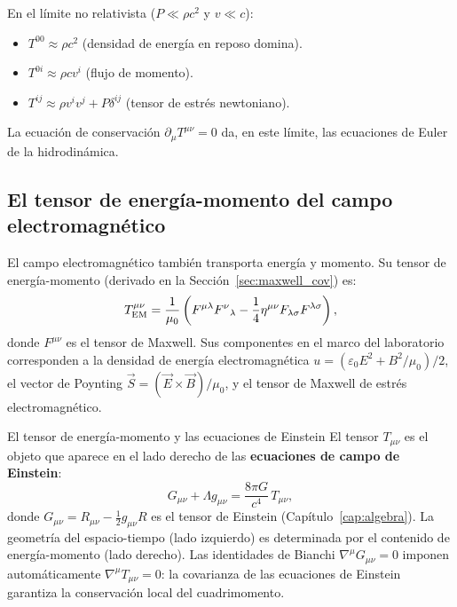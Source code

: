 \begin{importante}
En el límite no relativista ($P \ll \rho c^2$ y $v \ll c$):
\begin{itemize}[leftmargin=2em]
  \item $T^{00} \approx \rho c^2$ (densidad de energía en reposo domina).
  \item $T^{0i} \approx \rho c v^i$ (flujo de momento).
  \item $T^{ij} \approx \rho v^i v^j + P\delta^{ij}$ (tensor de estrés newtoniano).
\end{itemize}
La ecuación de conservación $\partial_\mu T^{\mu\nu} = 0$ da, en este límite, las ecuaciones de Euler de la hidrodinámica.
\end{importante}

\subsection{El tensor de energía-momento del campo electromagnético}

El campo electromagnético también transporta energía y momento. Su tensor de energía-momento (derivado en la Sección~\ref{sec:maxwell_cov}) es:
\begin{equation}
  T^{\mu\nu}_{\rm EM} = \frac{1}{\mu_0}\left(F^{\mu\lambda}F^\nu{}_\lambda - \frac{1}{4}\eta^{\mu\nu}F_{\lambda\sigma}F^{\lambda\sigma}\right),
  \label{eq:TEM}
\end{equation}
donde $F^{\mu\nu}$ es el tensor de Maxwell. Sus componentes en el marco del laboratorio corresponden a la densidad de energía electromagnética $u = (\varepsilon_0 E^2 + B^2/\mu_0)/2$, el vector de Poynting $\vec{S} = (\vec{E}\times\vec{B})/\mu_0$, y el tensor de Maxwell de estrés electromagnético.

\begin{observacion}{El tensor de energía-momento y las ecuaciones de Einstein}{}
El tensor $T_{\mu\nu}$ es el objeto que aparece en el lado derecho de las \textbf{ecuaciones de campo de Einstein}:
\[
  G_{\mu\nu} + \Lambda g_{\mu\nu} = \frac{8\pi G}{c^4}\,T_{\mu\nu},
\]
donde $G_{\mu\nu} = R_{\mu\nu} - \frac{1}{2}g_{\mu\nu}R$ es el tensor de Einstein (Capítulo~\ref{cap:algebra}). La geometría del espacio-tiempo (lado izquierdo) es determinada por el contenido de energía-momento (lado derecho). Las identidades de Bianchi $\nabla^\mu G_{\mu\nu} = 0$ imponen automáticamente $\nabla^\mu T_{\mu\nu} = 0$: la covarianza de las ecuaciones de Einstein garantiza la conservación local del cuadrimomento.
\end{observacion}

